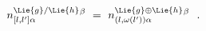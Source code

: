 \begin{equation}\label{anncoeff}
n_{[l,l']\alpha }^{\Lie{g}/\Lie{h}}{}^{\beta }\ =\ n_{(l,\omega (l'))\alpha
}^{\Lie{g}\oplus \Lie{h}}{}^{\beta } \ \ .
\end{equation}

